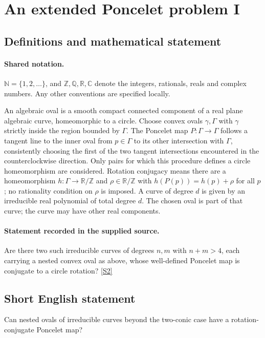 \documentclass[11pt]{article}
\newcommand{\sref}[2]{\hyperlink{source:#1:#2}{[S#2]}}
\begin{document}
\section{An extended Poncelet problem I}\label{statement}

\subsection{Definitions and mathematical statement}

\paragraph{Shared notation.}$\mathbb N=\{1,2,\ldots\}$, and $\mathbb Z,\mathbb Q,\mathbb R,\mathbb C$ denote the integers, rationals, reals and complex numbers. Any other conventions are specified locally.


An algebraic oval is a smooth compact connected component of a real plane algebraic curve, homeomorphic to a circle. Choose convex ovals $\gamma,\Gamma$ with $\gamma$ strictly inside the region bounded by $\Gamma$. The Poncelet map $P:\Gamma\to\Gamma$ follows a tangent line to the inner oval from $p\in\Gamma$ to its other intersection with $\Gamma$, consistently choosing the first of the two tangent intersections encountered in the counterclockwise direction. Only pairs for which this procedure defines a circle homeomorphism are considered. Rotation conjugacy means there are a homeomorphism $h:\Gamma\to\mathbb R/\mathbb Z$ and $\rho\in\mathbb R/\mathbb Z$ with $h(P(p))=h(p)+\rho$ for all $p$; no rationality condition on $\rho$ is imposed. A curve of degree $d$ is given by an irreducible real polynomial of total degree $d$. The chosen oval is part of that curve; the curve may have other real components.
\paragraph{Statement recorded in the supplied source.}
Are there two such irreducible curves of degrees $n,m$ with $n+m>4$, each carrying a nested convex oval as above, whose well-defined Poncelet map is conjugate to a circle rotation? \sref{statement}{2}
\subsection{Short English statement}
Can nested ovals of irreducible curves beyond the two-conic case have a rotation-conjugate Poncelet map?
\end{document}
